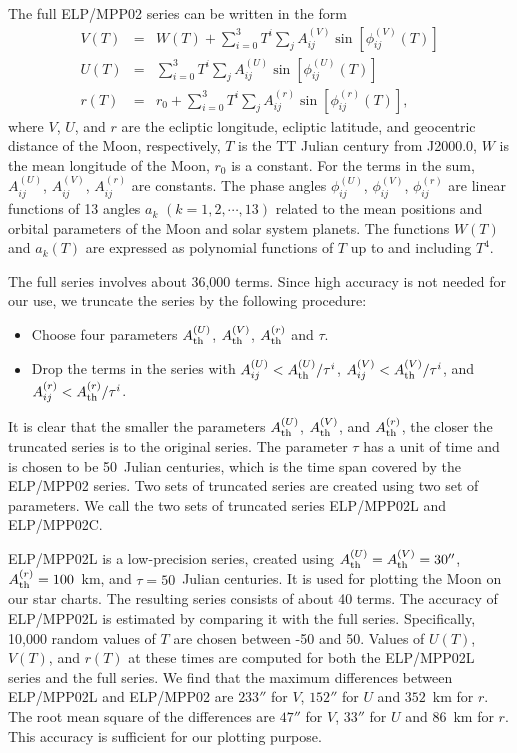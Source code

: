 \documentclass[12pt]{article}
\newcommand \beqn {\begin{eqnarray}}
\newcommand \eeqn {\end{eqnarray}}
\begin{document}
The full ELP/MPP02 series can be written in the form 
\beqn
  V(T) &=& W(T) + \sum_{i=0}^3 T^i \sum_j A^{(V)}_{ij} \sin\left[ \phi^{(V)}_{ij}(T)\right] \\ 
  U(T) &=& \sum_{i=0}^3 T^i \sum_j A^{(U)}_{ij} \sin\left[ \phi^{(U)}_{ij}(T)\right] \\ 
  r(T) &=& r_0 + \sum_{i=0}^3 T^i \sum_j A^{(r)}_{ij} \sin\left[ \phi^{(r)}_{ij}(T)\right] ,
\label{eq:Dmoon}
\eeqn
where $V$, $U$, and $r$ are the ecliptic longitude, ecliptic latitude, and geocentric 
distance of the Moon, respectively, $T$ is the TT Julian century from J2000.0, 
$W$ is the mean longitude of the Moon, $r_0$ is a constant. For the terms in the 
sum, $A^{(U)}_{ij}$, $A^{(V)}_{ij}$, $A^{(r)}_{ij}$ are constants. The phase 
angles $\phi^{(U)}_{ij}$, $\phi^{(V)}_{ij}$, $\phi^{(r)}_{ij}$ are linear functions 
of 13 angles $a_k$ $(k=1,2,\cdots, 13)$ related to the mean positions and orbital 
parameters of the Moon and solar system planets. The functions $W(T)$ and $a_k(T)$ 
are expressed as polynomial functions of $T$ up to and including $T^4$. 

The full series involves about 36,000 terms. Since high accuracy is not 
needed for our use, we truncate the series by the following procedure:

\begin{itemize}
\item Choose four parameters $A^{(U)}_{\rm th}$, $A^{(V)}_{\rm th}$, 
$A^{(r)}_{\rm th}$ and $\tau$. 

\item Drop the terms in the series with $A^{(U)}_{ij} < A^{(U)}_{\rm th} /\tau^i$, 
$A^{(V)}_{ij} < A^{(V)}_{\rm th} /\tau^i$, and 
$A^{(r)}_{ij} < A^{(r)}_{\rm th} /\tau^i$.
\end{itemize}

It is clear that the smaller the parameters $A^{(U)}_{\rm th}$, $A^{(V)}_{\rm th}$, 
and $A^{(r)}_{\rm th}$, the closer the truncated series is to the original series. 
The parameter $\tau$ has a unit of time and is chosen to be 50~Julian centuries, 
which is the time span covered by the ELP/MPP02 series. Two sets of truncated 
series are created using two set of parameters. We call the two sets of 
truncated series ELP/MPP02L and ELP/MPP02C.

ELP/MPP02L is a low-precision series, created using 
$A^{(U)}_{\rm th}=A^{(V)}_{\rm th}=30''$, $A^{(r)}_{\rm th}=100$~km, and $\tau = 50$~Julian centuries. It is used for plotting the Moon on our star charts. 
The resulting series consists of about 40 terms. 
The accuracy of ELP/MPP02L is estimated by comparing it with the full series. 
Specifically, 10,000 random values of $T$ are chosen between -50 and 50. Values of 
$U(T)$, $V(T)$, and $r(T)$ at these times are computed for both the ELP/MPP02L series and the 
full series. We find that the maximum differences between ELP/MPP02L and ELP/MPP02 
are $233''$ for $V$, $152''$ for $U$ and $352$~km for $r$. The root mean square 
of the differences are $47''$ for $V$, $33''$ for $U$ and $86$~km for $r$. This accuracy 
is sufficient for our plotting purpose.
\end{document}
